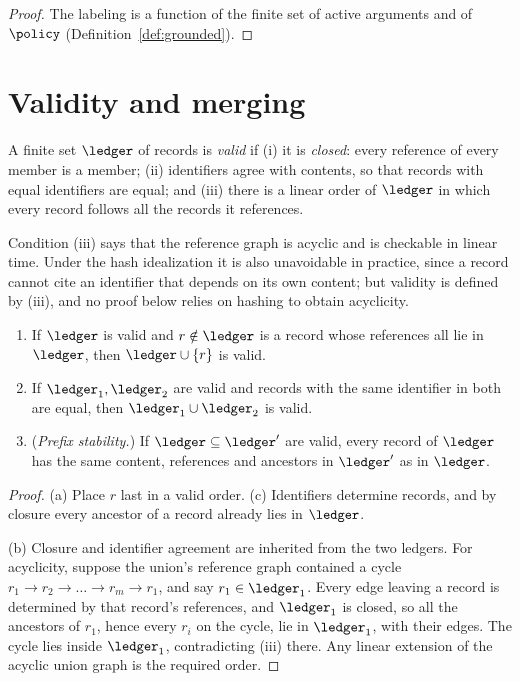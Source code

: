 \begin{proof}
The labeling is a function of the finite set of active arguments and of $\policy$ (Definition~\ref{def:grounded}).
\end{proof}

\section{Validity and merging}

\begin{definition}\label{def:valid}
A finite set $\ledger$ of records is \emph{valid} if (i) it is \emph{closed}: every reference of every member is a member; (ii) identifiers agree with contents, so that records with equal identifiers are equal; and (iii) there is a linear order of $\ledger$ in which every record follows all the records it references.
\end{definition}

Condition (iii) says that the reference graph is acyclic and is checkable in linear time. Under the hash idealization it is also unavoidable in practice, since a record cannot cite an identifier that depends on its own content; but validity is defined by (iii), and no proof below relies on hashing to obtain acyclicity.

\begin{theorem}\label{thm:valid}
\begin{enumerate}[label=(\alph*)]
\item If $\ledger$ is valid and $r\notin\ledger$ is a record whose references all lie in $\ledger$, then $\ledger\cup\{r\}$ is valid.
\item If $\ledger_1,\ledger_2$ are valid and records with the same identifier in both are equal, then $\ledger_1\cup\ledger_2$ is valid.
\item (\emph{Prefix stability.}) If $\ledger\subseteq\ledger'$ are valid, every record of $\ledger$ has the same content, references and ancestors in $\ledger'$ as in $\ledger$.
\end{enumerate}
\end{theorem}

\begin{proof}
(a) Place $r$ last in a valid order. (c) Identifiers determine records, and by closure every ancestor of a record already lies in $\ledger$.

(b) Closure and identifier agreement are inherited from the two ledgers. For acyclicity, suppose the union's reference graph contained a cycle $r_1\to r_2\to\dots\to r_m\to r_1$, and say $r_1\in\ledger_1$. Every edge leaving a record is determined by that record's references, and $\ledger_1$ is closed, so all the ancestors of $r_1$, hence every $r_i$ on the cycle, lie in $\ledger_1$, with their edges. The cycle lies inside $\ledger_1$, contradicting (iii) there. Any linear extension of the acyclic union graph is the required order.
\end{proof}
